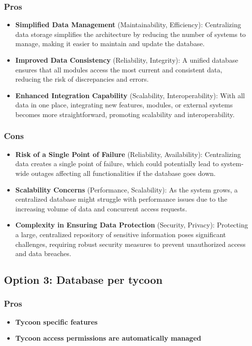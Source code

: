 \subsubsection*{Pros}
\begin{itemize}[noitemsep]
    \item \textbf{Simplified Data Management} (Maintainability, Efficiency): Centralizing data storage simplifies the architecture by reducing the number of systems to manage, making it easier to maintain and update the database.
    \item \textbf{Improved Data Consistency} (Reliability, Integrity): A unified database ensures that all modules access the most current and consistent data, reducing the risk of discrepancies and errors.
    \item \textbf{Enhanced Integration Capability} (Scalability, Interoperability): With all data in one place, integrating new features, modules, or external systems becomes more straightforward, promoting scalability and interoperability.
\end{itemize}

\subsubsection*{Cons}
\begin{itemize}[noitemsep]
    \item \textbf{Risk of a Single Point of Failure} (Reliability, Availability): Centralizing data creates a single point of failure, which could potentially lead to system-wide outages affecting all functionalities if the database goes down.
    \item \textbf{Scalability Concerns} (Performance, Scalability): As the system grows, a centralized database might struggle with performance issues due to the increasing volume of data and concurrent access requests.
    \item \textbf{Complexity in Ensuring Data Protection} (Security, Privacy): Protecting a large, centralized repository of sensitive information poses significant challenges, requiring robust security measures to prevent unauthorized access and data breaches.
\end{itemize}

\subsection*{Option 3: Database per tycoon}

\subsubsection*{Pros}
\begin{itemize}[noitemsep]
    \item \textbf{Tycoon specific features} 
    \item \textbf{Tycoon access permissions are automatically managed} 
\end{itemize}

